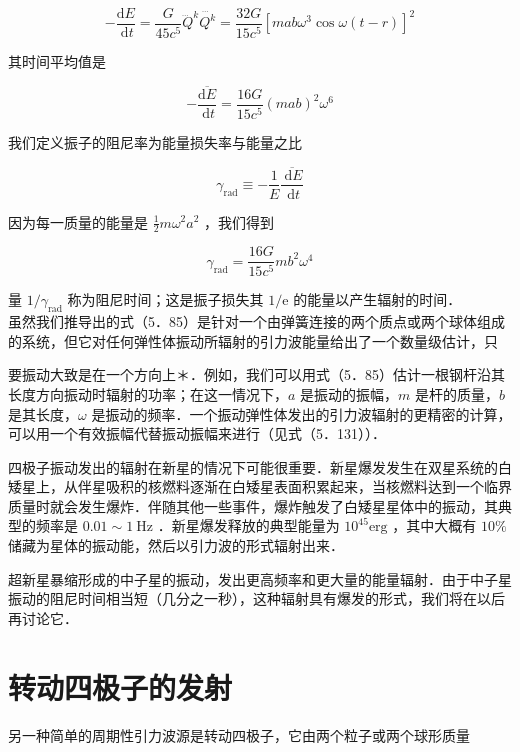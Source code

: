 \begin{equation*}
	-\frac{\mathrm{d} E}{\mathrm{~d} t}=\frac{G}{45 c^{5}} \dddot{Q}^{k} \dddot{Q^{k}}=\frac{32 G}{15 c^{5}}\left[m a b \omega^{3} \cos \omega(t-r)\right]^{2} \tag{5.84}
\end{equation*}


其时间平均值是


\begin{equation*}
	-\frac{\overline{\mathrm{d} E}}{\mathrm{~d} t}=\frac{16 G}{15 c^{5}}(m a b)^{2} \omega^{6} \tag{5.85}
\end{equation*}


我们定义振子的阻尼率为能量损失率与能量之比


\begin{equation*}
	\gamma_{\mathrm{rad}} \equiv-\frac{1}{E} \frac{\overline{\mathrm{~d} E}}{\mathrm{~d} t} \tag{5.86}
\end{equation*}


因为每一质量的能量是 $\frac{1}{2} m \omega^{2} a^{2}$ ，我们得到


\begin{equation*}
	\gamma_{\mathrm{rad}}=\frac{16 G}{15 c^{5}} m b^{2} \omega^{4} \tag{5.87}
\end{equation*}


量 $1 / \gamma_{\mathrm{rad}}$ 称为阻尼时间；这是振子损失其 $1 / \mathrm{e}$ 的能量以产生辐射的时间．\\
虽然我们推导出的式（5．85）是针对一个由弹簧连接的两个质点或两个球体组成的系统，但它对任何弹性体振动所辐射的引力波能量给出了一个数量级估计，只

要振动大致是在一个方向上＊．例如，我们可以用式（5．85）估计一根钢杆沿其长度方向振动时辐射的功率；在这一情况下，$a$ 是振动的振幅，$m$ 是杆的质量，$b$ 是其长度，$\omega$ 是振动的频率．一个振动弹性体发出的引力波辐射的更精密的计算，可以用一个有效振幅代替振动振幅来进行（见式（5．131））．

四极子振动发出的辐射在新星的情况下可能很重要．新星爆发发生在双星系统的白矮星上，从伴星吸积的核燃料逐渐在白矮星表面积累起来，当核燃料达到一个临界质量时就会发生爆炸．伴随其他一些事件，爆炸触发了白矮星星体中的振动，其典型的频率是 $0.01 \sim 1 \mathrm{~Hz}$ ．新星爆发释放的典型能量为 $10^{45} \mathrm{erg}$ ，其中大概有 $10 \%$ 储藏为星体的振动能，然后以引力波的形式辐射出来．

超新星暴缩形成的中子星的振动，发出更高频率和更大量的能量辐射．由于中子星振动的阻尼时间相当短（几分之一秒），这种辐射具有爆发的形式，我们将在以后再讨论它．

\section{转动四极子的发射}
另一种简单的周期性引力波源是转动四极子，它由两个粒子或两个球形质量\\


